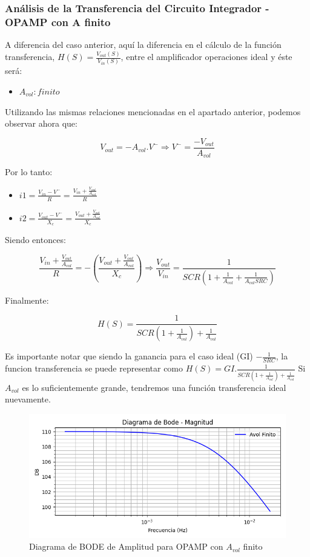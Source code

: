 \subsubsection{Análisis de la Transferencia del Circuito Integrador - OPAMP con A finito}

A diferencia del caso anterior, aquí la diferencia en el cálculo de la función transferencia, $H(S) = \frac{V_{out} (S)}{V_{in} (S)}$,
entre el amplificador operaciones ideal y éste será:

\begin{itemize}
	\item $A_{vol}: finito$
\end{itemize}

Utilizando las mismas relaciones mencionadas en el apartado anterior, podemos observar ahora que:


$$V_{out}=-A_{vol}.V^{-} \Longrightarrow V^{-} = \frac{-V_{out}}{A_{vol}}$$ 


Por lo tanto:

\begin{itemize}
	\item $i1 = \frac {V_{in}-V^{-}}{R} =  \frac {V_{in} + \frac{V_{out}}{A_{vol}}}{R}$
	\item $i2 = \frac {V_{out}-V^{-}}{X_c} = \frac {V_{out} + \frac{V_{out}}{A_{vol}}}{X_c}$
\end{itemize}

Siendo entonces:

$$ \frac {V_{in} + \frac{V_{out}}{A_{vol}}}{R} = -(\frac {V_{out} + \frac{V_{out}}{A_{vol}}}{X_c})
\Longrightarrow \frac{V_{out}}{V_{in}} = \frac{1}{SCR(1+\frac{1}{A_{vol}}+\frac{1}{A_{vol}SRC})}$$

Finalmente:

$$H(S)= \frac{1}{SCR(1+\frac{1}{A_{vol}})+\frac{1}{A_{vol}}}$$

Es importante notar que siendo la ganancia para el caso ideal (GI) $- \frac{1}{SRC}$,  la funcion
transferencia se puede representar como $H(S) = GI. \frac{1}{SCR(1+\frac{1}{A_{vol}})+\frac{1}{A_{vol}}}$
Si $A_{vol}$ es lo suficientemente grande, tendremos una función transferencia ideal nuevamente.

\begin{figure}[H]
    \centering 
    \includegraphics [scale=1] {../Ejercicio3-CircuitoIntegradoresyDerivadores/Imagenes/diagrama-bode-cideal-amplitud.png} 
    \caption{Diagrama de BODE de Amplitud para OPAMP con $A_{vol}$ finito}
    \label{fig:emptyPlotTool}
\end{figure}

